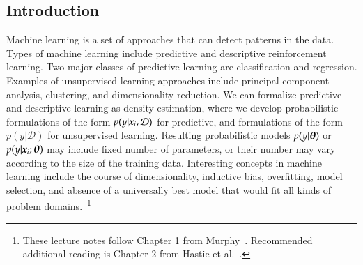 \begin{refsection}
\chapter{Introduction}

\begin{summary}
Machine learning is a set of approaches that can detect patterns in the data. Types of machine learning include predictive and descriptive reinforcement learning. Two major classes of predictive learning are classification and regression. Examples of unsupervised learning approaches include principal component analysis, clustering, and dimensionality reduction. We can formalize predictive and descriptive learning as density estimation, where we develop probabilistic formulations of the form $p(y|\boldsymbol{x}_i,\mathcal{D})$ for predictive, and formulations of the form $p(y|\mathcal{D})$ for unsupervised learning. Resulting probabilistic models $p(y|\boldsymbol{\theta})$ or $p(y|\boldsymbol{x}_i; \boldsymbol{\theta})$ may include fixed number of parameters, or their number may vary according to the size of the training data. Interesting concepts in machine learning include the course of dimensionality, inductive bias, overfitting, model selection, and absence of a universally best model that would fit all kinds of problem domains.~\footnote{These lecture notes follow Chapter 1 from Murphy~\cite{2012-Murphy}. Recommended additional reading is Chapter 2 from Hastie et al.~\cite{2016-Hastie}.}
\end{summary}



\end{refsection}
